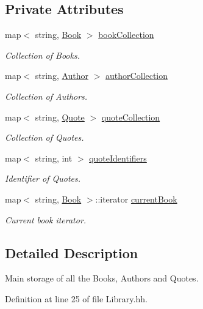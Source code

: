 \subsection*{Private Attributes}
\begin{DoxyCompactItemize}
\item 
map$<$ string, \hyperlink{class_book}{Book} $>$ \hyperlink{class_library_a5807d6d006ac0aa0a184831f0f2e5415}{book\+Collection}
\begin{DoxyCompactList}\small\item\em Collection of Books. \end{DoxyCompactList}\item 
map$<$ string, \hyperlink{class_author}{Author} $>$ \hyperlink{class_library_a7a6958a0dc85a1c816ca35727306cd62}{author\+Collection}
\begin{DoxyCompactList}\small\item\em Collection of Authors. \end{DoxyCompactList}\item 
map$<$ string, \hyperlink{class_quote}{Quote} $>$ \hyperlink{class_library_a84be5207332f4b2456af95907d0a43b5}{quote\+Collection}
\begin{DoxyCompactList}\small\item\em Collection of Quotes. \end{DoxyCompactList}\item 
map$<$ string, int $>$ \hyperlink{class_library_a58c1f12a0278872cd0299e586551bb7a}{quote\+Identifiers}
\begin{DoxyCompactList}\small\item\em Identifier of Quotes. \end{DoxyCompactList}\item 
map$<$ string, \hyperlink{class_book}{Book} $>$\+::iterator \hyperlink{class_library_a78a4071e8d610da671b3886c71900dae}{current\+Book}
\begin{DoxyCompactList}\small\item\em Current book iterator. \end{DoxyCompactList}\end{DoxyCompactItemize}


\subsection{Detailed Description}
Main storage of all the Books, Authors and Quotes. 

Definition at line 25 of file Library.\+hh.



